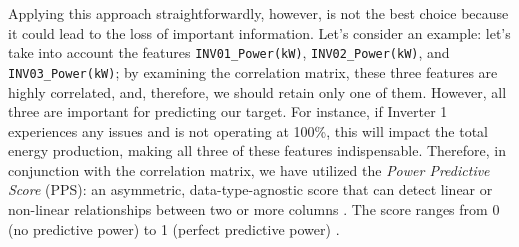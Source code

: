 Applying this approach straightforwardly, however, is not the best choice because it
could lead to the loss of important information.
Let's consider an example: let's take into account the features \verb|INV01_Power(kW)|,
\verb|INV02_Power(kW)|, and \verb|INV03_Power(kW)|; by examining the correlation matrix, these
three features are highly correlated, and, therefore, we should retain only one of them.
However, all three are important for predicting our target.
For instance, if Inverter 1 experiences any issues and is not operating at 100\%,
this will impact the total energy production, making all three of these
features indispensable. Therefore, in conjunction with the correlation matrix,
we have utilized the \textit{Power Predictive Score} (PPS): an asymmetric,
data-type-agnostic score that can detect linear or non-linear relationships
between two or more columns \cite{pps}. The score ranges from 0 (no predictive power)
to 1 (perfect predictive power) \cite{pps}.

